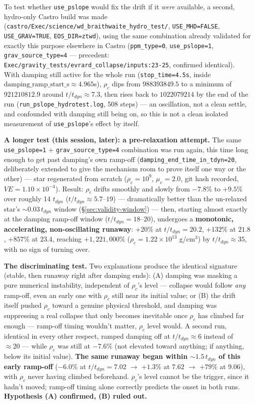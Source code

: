 \documentclass[11pt,a4paper]{scrartcl}
\newcommand{\code}[1]{\texttt{\small #1}}
\begin{document}
To test whether \code{use\_pslope} would fix the drift if it \emph{were}
available, a second, hydro-only Castro build was made
(\code{castro/Exec/science/wd\_braithwaite\_hydro\_test/},
\code{USE\_MHD=FALSE}, \code{USE\_GRAV=TRUE}, \code{EOS\_DIR=ztwd}),
using the same combination already validated for exactly this purpose
elsewhere in Castro (\code{ppm\_type=0}, \code{use\_pslope=1},
\code{grav\_source\_type=4} --- precedent:
\code{Exec/gravity\_tests/evrard\_collapse/inputs:23-25}, confirmed
identical). With damping still active for the whole run
(\code{stop\_time=4.5s}, inside
$\text{damping\_ramp\_start\_s}\approx4.965$s), $\rho_c$ dips from
$988393849.5$ to a minimum of $921210812.9$ around
$t/t_{dyn}\approx7.3$, then rises back to $1022079214$ by the end of
the run (\code{run\_pslope\_hydrotest.log}, 508 steps) --- an
oscillation, not a clean settle, and confounded with damping still
being on, so this is not a clean isolated measurement of
\code{use\_pslope}'s effect by itself.

\textbf{A longer test (this session, later): a pre-relaxation attempt.}
The same \code{use\_pslope=1} + \code{grav\_source\_type=4} combination
was run again, this time long enough to get past damping's own ramp-off
(\code{damping\_end\_time\_in\_tdyn=20}, deliberately extended to give
the mechanism room to prove itself one way or the other) --- star
regenerated from scratch ($\rho_c=10^9$, $\mu_e=2.0$, git hash
recorded, $VE=1.10\times10^{-4}$). Result: $\rho_c$ drifts smoothly and
slowly from $-7.8\%$ to $+9.5\%$ over roughly 14 $t_{dyn}$
($t/t_{dyn}\approx5.7$--$19$) --- dramatically better than the
un-relaxed star's $\sim0.03\,t_{dyn}$ window (\S\ref{sec:validity-window})
--- then, starting almost exactly at the damping ramp-off window
($t/t_{dyn}=18$--$20$), undergoes a \textbf{monotonic, accelerating,
non-oscillating runaway}: $+20\%$ at $t/t_{dyn}=20.2$, $+132\%$ at
$21.8$, $+857\%$ at $23.4$, reaching $+1{,}221{,}000\%$
($\rho_c=1.22\times10^{13}$ g/cm$^3$) by $t/t_{dyn}\approx35$, with no
sign of turning over.

\textbf{The discriminating test.} Two explanations produce the
identical signature (stable, then runaway right after damping ends):
(A) damping was masking a pure numerical instability, independent of
$\rho_c$'s level --- collapse would follow \emph{any} ramp-off, even an
early one with $\rho_c$ still near its initial value; or (B) the drift
itself pushed $\rho_c$ toward a genuine physical threshold, and damping
was suppressing a real collapse that only becomes inevitable once
$\rho_c$ has climbed far enough --- ramp-off timing wouldn't matter,
$\rho_c$ level would. A second run, identical in every other respect,
ramped damping off at $t/t_{dyn}\approx6$ instead of $\approx20$ ---
while $\rho_c$ was still at $-7.6\%$ (not elevated toward anything; if
anything, below its initial value). \textbf{The same runaway began
within $\sim1.5\,t_{dyn}$ of this early ramp-off} ($-6.0\%$ at
$t/t_{dyn}=7.02$ $\to$ $+1.3\%$ at $7.62$ $\to$ $+79\%$ at $9.06$),
with $\rho_c$ never having climbed beforehand. $\rho_c$'s level cannot
be the trigger, since it hadn't moved; ramp-off timing alone correctly
predicts the onset in both runs. \textbf{Hypothesis (A) confirmed, (B)
ruled out.}
\end{document}
